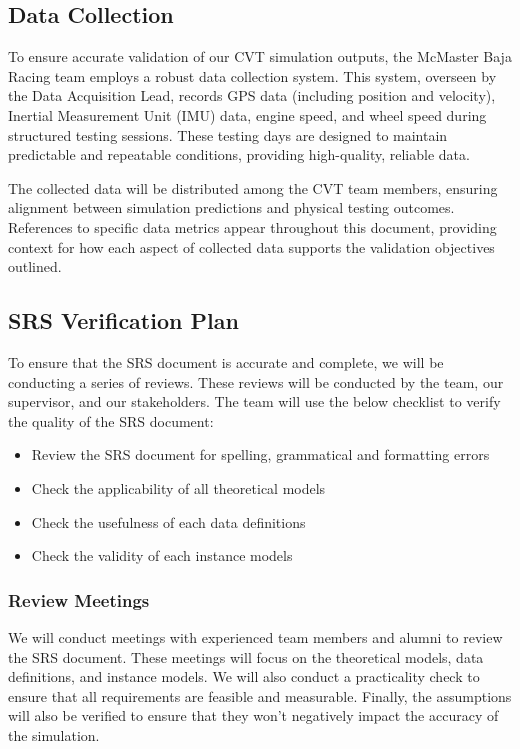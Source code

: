 \documentclass[12pt, titlepage]{article}
\begin{document}
\subsection{Data Collection}

\noindent To ensure accurate validation of our CVT simulation outputs, the McMaster Baja Racing team employs a robust data collection system. This system, overseen by the Data Acquisition Lead, records GPS data (including position and velocity), Inertial Measurement Unit (IMU) data, engine speed, and wheel speed during structured testing sessions. These testing days are designed to maintain predictable and repeatable conditions, providing high-quality, reliable data.

The collected data will be distributed among the CVT team members, ensuring alignment between simulation predictions and physical testing outcomes. References to specific data metrics appear throughout this document, providing context for how each aspect of collected data supports the validation objectives outlined.
\subsection{SRS Verification Plan}

\noindent To ensure that the SRS document is accurate and complete, we will be conducting a series of reviews.
These reviews will be conducted by the team, our supervisor, and our stakeholders.
The team will use the below checklist to verify the quality of the SRS document:
\begin{itemize}
  \item Review the SRS document for spelling, grammatical and formatting errors
  \item Check the applicability of all theoretical models
  \item Check the usefulness of each data definitions
  \item Check the validity of each instance models
\end{itemize}

\subsubsection*{Review Meetings}
We will conduct meetings with experienced team members and alumni to review the SRS document.
These meetings will focus on the theoretical models, data definitions, and instance models.
We will also conduct a practicality check to ensure that all requirements are feasible and measurable.
Finally, the assumptions will also be verified to ensure that they won't negatively impact the accuracy of the simulation.
\end{document}
